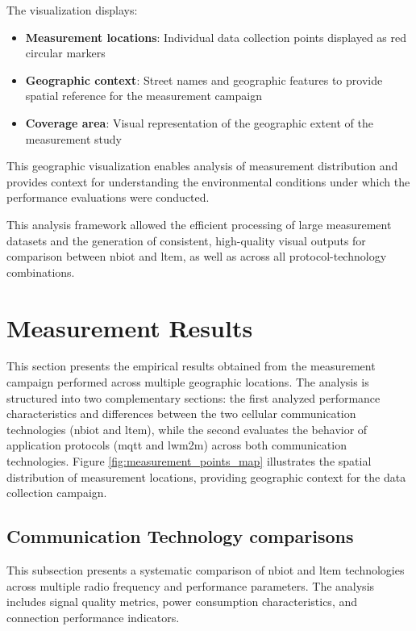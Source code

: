 \documentclass[12pt, english, openany]{book}
\begin{document}
\begin{itemize}
          The visualization displays:
          \begin{itemize}
              \item \textbf{Measurement locations}: Individual data collection points displayed as red circular markers
              \item \textbf{Geographic context}: Street names and geographic features to provide spatial reference for the measurement campaign
              \item \textbf{Coverage area}: Visual representation of the geographic extent of the measurement study
          \end{itemize}

          This geographic visualization enables analysis of measurement distribution and provides context for understanding the environmental conditions under which the performance evaluations were conducted.
\end{itemize}

This analysis framework allowed the efficient processing of large measurement datasets and the generation of consistent, high-quality visual outputs for comparison between \gls{nbiot} and \gls{ltem}, as well as across all protocol-technology combinations.


\section{Measurement Results} \label{sec:measurement_results}

This section presents the empirical results obtained from the measurement campaign performed across multiple geographic locations. The analysis is structured into two complementary sections: the first analyzed performance characteristics and differences between the two cellular communication technologies (\gls{nbiot} and \gls{ltem}), while the second evaluates the behavior of application protocols (\gls{mqtt} and \gls{lwm2m}) across both communication technologies. Figure \ref{fig:measurement_points_map} illustrates the spatial distribution of measurement locations, providing geographic context for the data collection campaign.


\subsection{Communication Technology comparisons} \label{sec:results_by_communication_technology}

This subsection presents a systematic comparison of \gls{nbiot} and \gls{ltem} technologies across multiple radio frequency and performance parameters. The analysis includes signal quality metrics, power consumption characteristics, and connection performance indicators.
\end{document}
